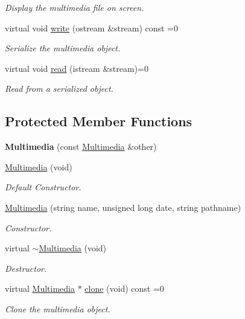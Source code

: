 \begin{DoxyCompactItemize}
\begin{DoxyCompactList}\small\item\em Display the multimedia file on screen. \end{DoxyCompactList}\item 
virtual void \hyperlink{class_multimedia_aa3c800e85ac5256ee8d1399d2ba33329}{write} (ostream \&stream) const =0
\begin{DoxyCompactList}\small\item\em Serialize the multimedia object. \end{DoxyCompactList}\item 
virtual void \hyperlink{class_multimedia_ab686208e53fe8161bb86f7d37e01784c}{read} (istream \&stream)=0
\begin{DoxyCompactList}\small\item\em Read from a serialized object. \end{DoxyCompactList}\end{DoxyCompactItemize}
\subsection*{Protected Member Functions}
\begin{DoxyCompactItemize}
\item 
\hypertarget{class_multimedia_ab97f71237bc4dbfc515c69ffcc279f63}{{\bfseries Multimedia} (const \hyperlink{class_multimedia}{Multimedia} \&other)}\label{class_multimedia_ab97f71237bc4dbfc515c69ffcc279f63}

\item 
\hyperlink{class_multimedia_af613763f6779c2e75fce0749b9a8a734}{Multimedia} (void)
\begin{DoxyCompactList}\small\item\em Default Constructor. \end{DoxyCompactList}\item 
\hyperlink{class_multimedia_a4b955c8674fb9ff39e57fd178f08bada}{Multimedia} (string name, unsigned long date, string pathname)
\begin{DoxyCompactList}\small\item\em Constructor. \end{DoxyCompactList}\item 
virtual \hyperlink{class_multimedia_a53798cec796a3aa8df3a35dfaa37bfe7}{$\sim$\-Multimedia} (void)
\begin{DoxyCompactList}\small\item\em Destructor. \end{DoxyCompactList}\item 
virtual \hyperlink{class_multimedia}{Multimedia} $\ast$ \hyperlink{class_multimedia_a2955c15860b8310ee684d391e7b3386f}{clone} (void) const =0
\begin{DoxyCompactList}\small\item\em Clone the multimedia object. \end{DoxyCompactList}\end{DoxyCompactItemize}
